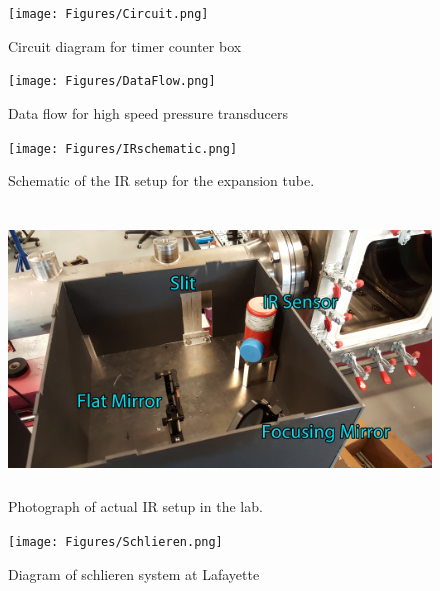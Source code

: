 \begin{figure}
\centering
\texttt{[image: Figures/Circuit.png]}
\caption[Circuit Diagram for Timer Counter Box]{Circuit diagram for timer counter box}
\label{fig:timercircuit}
\end{figure}


\begin{figure}[p!]
\centering
\texttt{[image: Figures/DataFlow.png]}
\caption[Data Flow for High Speed Pressure Transducers]{Data flow for high speed pressure transducers}
\label{fig:DataFlow}
\end{figure}
\clearpage

\begin{figure}
\centering
\texttt{[image: Figures/IRschematic.png]}
\caption[IR setup diagram]{Schematic of the IR setup for the expansion tube.}
\label{fig:IRschematic}
\end{figure}

\begin{figure}
\centering
\includegraphics[height = 3in]{Figures/IRLabeled.jpg}
\caption[Labeled photograph of IR setup]{Photograph of actual IR setup in the lab.}
\label{fig:IRlabel}
\end{figure}

%

\begin{figure}
\centering
\texttt{[image: Figures/Schlieren.png]}
\caption[Schlieren Diagram]{Diagram of schlieren system at Lafayette}
\label{fig:schlieren}
\end{figure}